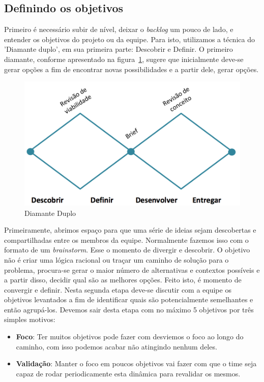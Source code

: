 \documentclass[10pt]{article}
\begin{document}
    	\subsection{Definindo os objetivos}\label{sec:abordagem-objetivos}
            Primeiro é necessário subir de nível, deixar o \textit{backlog} um pouco de lado, e entender os objetivos do projeto ou da equipe. Para isto, utilizamos a técnica do 'Diamante duplo'\cite{DoubleDiamond}, em sua primeira parte: Descobrir e Definir. O primeiro diamante, conforme apresentado na figura~\ref{figura:1}, sugere que inicialmente deve-se gerar opções a fim de encontrar novas possibilidades e a partir dele, gerar opções.
            
            \begin{figure}[H]
        		\centering
        		\includegraphics[width=.5\textwidth]{images/diamante-duplo.png}
        		\caption{Diamante Duplo}
        		\label{figura:1}
        	\end{figure}
        	
            Primeiramente, abrimos espaço para que uma série de ideias sejam descobertas e compartilhadas entre os membros da equipe. Normalmente fazemos isso com o formato de um \textit{brainstorm}. Esse o momento de divergir e descobrir. O objetivo não é criar uma lógica racional ou traçar um caminho de solução para o problema, procura-se gerar o maior número de alternativas e contextos possíveis e a partir disso, decidir qual são as melhores opções. Feito isto, é momento de convergir e definir. Nesta segunda etapa deve-se discutir com a equipe os objetivos levantados a fim de identificar quais são potencialmente semelhantes e então agrupá-los. Devemos sair desta etapa com no máximo 5 objetivos por três simples motivos:
            \begin{itemize}
                \item \textbf{Foco}: Ter muitos objetivos pode fazer com desviemos o foco ao longo do caminho, com isso podemos acabar não atingindo nenhum deles.
                \item \textbf{Validação}: Manter o foco em poucos objetivos vai fazer com que o time seja capaz de rodar periodicamente esta dinâmica para revalidar os mesmos. 
            \end{itemize}
        
\end{document}
